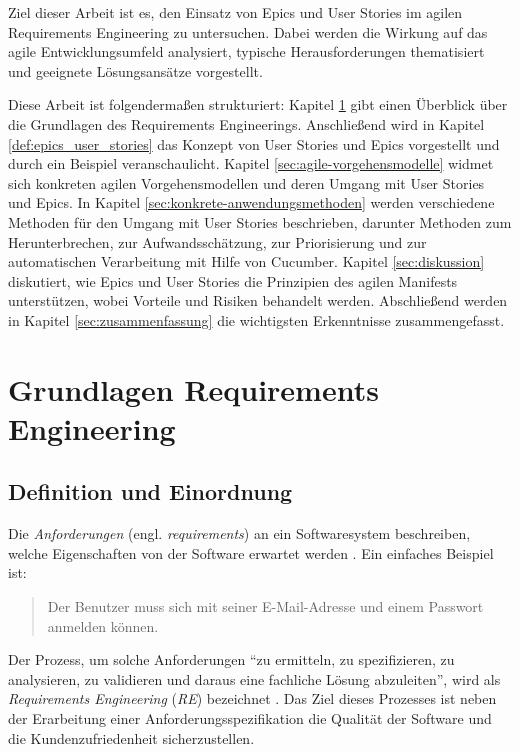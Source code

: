 \documentclass[acmtog]{acmart}
\begin{document}
Ziel dieser Arbeit ist es, den Einsatz von Epics und User Stories im agilen Requirements Engineering zu untersuchen. Dabei werden die Wirkung auf das agile Entwicklungsumfeld analysiert, typische Herausforderungen thematisiert und geeignete Lösungsansätze vorgestellt.

Diese Arbeit ist folgendermaßen strukturiert:
Kapitel \ref{sec:requirements-engineering} gibt einen Überblick über die Grundlagen des Requirements Engineerings.
Anschließend wird in Kapitel \ref{def:epics_user_stories} das Konzept von User Stories und Epics vorgestellt und durch ein Beispiel veranschaulicht.
Kapitel \ref{sec:agile-vorgehensmodelle} widmet sich konkreten agilen Vorgehensmodellen und deren Umgang mit User Stories und Epics.
In Kapitel \ref{sec:konkrete-anwendungsmethoden} werden verschiedene Methoden für den Umgang mit User Stories beschrieben, darunter Methoden zum Herunterbrechen, zur Aufwandsschätzung, zur Priorisierung und zur automatischen Verarbeitung mit Hilfe von Cucumber.
Kapitel \ref{sec:diskussion} diskutiert, wie Epics und User Stories die Prinzipien des agilen Manifests unterstützen, wobei Vorteile und Risiken behandelt werden.
Abschließend werden in Kapitel \ref{sec:zusammenfassung} die wichtigsten Erkenntnisse zusammengefasst.

\section{Grundlagen Requirements Engineering} \label{sec:requirements-engineering}

\subsection{Definition und Einordnung}
Die \emph{Anforderungen} (engl. \textit{requirements}) an ein Softwaresystem beschreiben, welche Eigenschaften von der Software erwartet werden \cite{sommerville16}.
Ein einfaches Beispiel ist:
\begin{quote}
	Der Benutzer muss sich mit seiner E-Mail-Adresse und einem Passwort anmelden können.
\end{quote}

Der Prozess, um solche Anforderungen ``zu ermitteln, zu spezifizieren, zu analysieren, zu validieren und daraus eine fachliche Lösung abzuleiten'', wird als \emph{Requirements Engineering} (\emph{RE}) bezeichnet \cite{balzert09}.
Das Ziel dieses Prozesses ist neben der Erarbeitung einer Anforderungsspezifikation die Qualität der Software und die Kundenzufriedenheit sicherzustellen.
\end{document}
